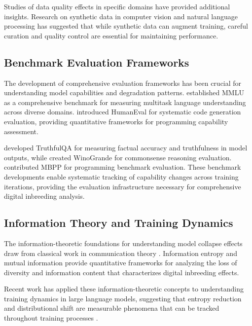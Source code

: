 \documentclass{article}
\begin{document}
Studies of data quality effects in specific domains have provided additional insights. Research on synthetic data in computer vision \citep{borji2022pros} and natural language processing has suggested that while synthetic data can augment training, careful curation and quality control are essential for maintaining performance.

\subsection{Benchmark Evaluation Frameworks}

The development of comprehensive evaluation frameworks has been crucial for understanding model capabilities and degradation patterns. \citet{hendrycks2020measuring} established MMLU as a comprehensive benchmark for measuring multitask language understanding across diverse domains. \citet{chen2021evaluating} introduced HumanEval for systematic code generation evaluation, providing quantitative frameworks for programming capability assessment.

\citet{lin2022truthfulqa} developed TruthfulQA for measuring factual accuracy and truthfulness in model outputs, while \citet{sakaguchi2020winogrande} created WinoGrande for commonsense reasoning evaluation. \citet{austin2021program} contributed MBPP for programming benchmark evaluation. These benchmark developments enable systematic tracking of capability changes across training iterations, providing the evaluation infrastructure necessary for comprehensive digital inbreeding analysis.

\subsection{Information Theory and Training Dynamics}

The information-theoretic foundations for understanding model collapse effects draw from classical work in communication theory \citep{shannon1948mathematical, cover1999elements}. Information entropy and mutual information provide quantitative frameworks for analyzing the loss of diversity and information content that characterizes digital inbreeding effects.

Recent work has applied these information-theoretic concepts to understanding training dynamics in large language models, suggesting that entropy reduction and distributional shift are measurable phenomena that can be tracked throughout training processes \citep{hoffmann2022training}.
\end{document}
